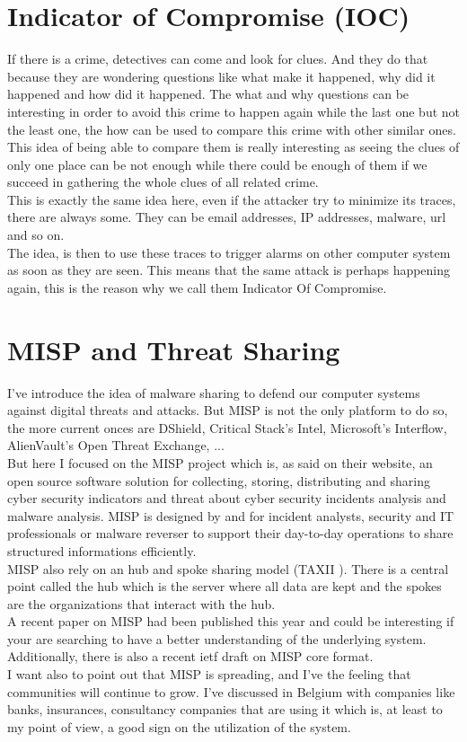 \documentclass{eplmastersthesis}
\begin{document}
\section{Indicator of Compromise (IOC)}
If there is a crime, detectives can come and look for clues. And they do that because they are wondering questions like what make it happened, why did it happened and how did it happened. The what and why questions can be interesting in order to avoid this crime to happen again while the last one but not the least one, the how can be used to compare this crime with other similar ones.\\
This idea of being able to compare them is really interesting as seeing the clues of only one place can be not enough while there could be enough of them if we succeed in gathering the whole clues of all related crime.\\
This is exactly the same idea here, even if the attacker try to minimize its traces, there are always some. They can be email addresses, IP addresses, malware, url and so on.\\
The idea, is then to use these traces to trigger alarms on other computer system as soon as they are seen. This means that the same attack is perhaps happening again, this is the reason why we call them Indicator Of Compromise.


\section{MISP and Threat Sharing}
I've introduce the idea of malware sharing to defend our computer systems against digital threats and attacks. But MISP is not the only platform to do so, the more current onces are DShield, Critical Stack’s Intel, Microsoft’s Interflow, AlienVault’s Open Threat Exchange, ...\\
But here I focused on the MISP project which is, as said on their website, an open source software solution for collecting, storing, distributing and sharing cyber security indicators and threat about cyber security incidents analysis and malware analysis. MISP is designed by and for incident analysts, security and IT professionals or malware reverser to support their day-to-day operations to share structured informations efficiently.\\
MISP also rely on an hub and spoke sharing model (TAXII \cite{taxiiWebsite}). There is a central point called the hub which is the server where all data are kept and the spokes are the organizations that interact with the hub.\\
A recent paper on MISP \cite{wagner2016misp} had been published this year and could be interesting if your are searching to have a better understanding of the underlying system. Additionally, there is also a recent ietf draft on MISP core format\cite{MispDraft}.\\
I want also to point out that MISP is spreading, and I've the feeling that communities will continue to grow. I've discussed in Belgium with companies like banks, insurances, consultancy companies that are using it which is, at least to my point of view, a good sign on the utilization of the system.
\end{document}
